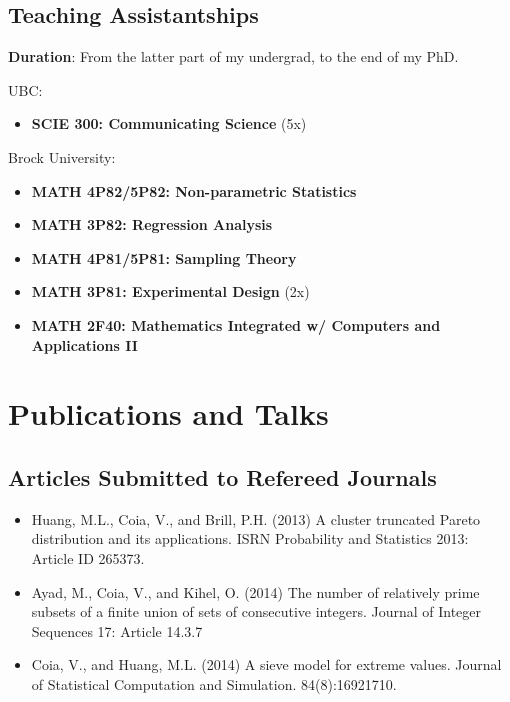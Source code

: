 \documentclass[]{book}
\providecommand{\tightlist}{%
  \setlength{\itemsep}{0pt}\setlength{\parskip}{0pt}}
\begin{document}
\hypertarget{teaching-assistantships}{%
\subsection{Teaching Assistantships}\label{teaching-assistantships}}

\textbf{Duration}: From the latter part of my undergrad, to the end of my PhD.

UBC:

\begin{itemize}
\tightlist
\item
  \textbf{SCIE 300: Communicating Science} (5x)
\end{itemize}

Brock University:

\begin{itemize}
\tightlist
\item
  \textbf{MATH 4P82/5P82: Non-parametric Statistics}
\item
  \textbf{MATH 3P82: Regression Analysis}
\item
  \textbf{MATH 4P81/5P81: Sampling Theory}
\item
  \textbf{MATH 3P81: Experimental Design} (2x)
\item
  \textbf{MATH 2F40: Mathematics Integrated w/ Computers and Applications II}
\end{itemize}

\hypertarget{publications-and-talks}{%
\section{Publications and Talks}\label{publications-and-talks}}

\hypertarget{articles-submitted-to-refereed-journals}{%
\subsection{Articles Submitted to Refereed Journals}\label{articles-submitted-to-refereed-journals}}

\begin{itemize}
\item
  Huang, M.L., Coia, V., and Brill, P.H. (2013) A cluster truncated
  Pareto distribution and its applications. ISRN Probability and
  Statistics 2013: Article ID 265373.
\item
  Ayad, M., Coia, V., and Kihel, O. (2014) The number of relatively
  prime subsets of a finite union of sets of consecutive integers.
  Journal of Integer Sequences 17: Article 14.3.7
\item
  Coia, V., and Huang, M.L. (2014) A sieve model for extreme
  values. Journal of Statistical Computation and Simulation.
  84(8):16921710.
\end{itemize}
\end{document}

